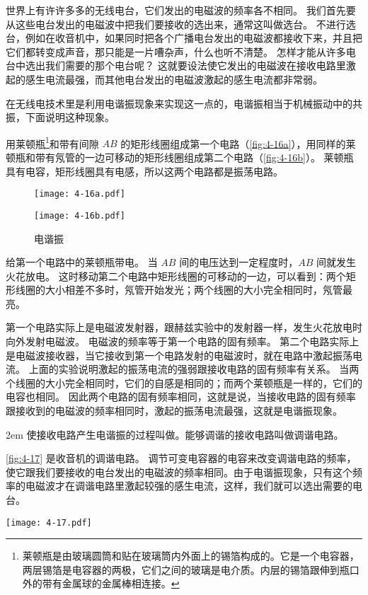 世界上有许许多多的无线电台，它们发出的电磁波的频率各不相同。
我们首先要从这些电台发出的电磁波中把我们要接收的选出来，通常这叫做选台。
不进行选台，例如在收音机中，如果同时把各个广播电台发出的电磁波都接收下来，并且把它们都转变成声音，那只能是一片嘈杂声，什么也听不清楚。
怎样才能从许多电台中选出我们需要的那个电台呢？
这就要设法使它发出的电磁波在接收电路里激起的感生电流最强，而其他电台发出的电磁波激起的感生电流都非常弱。

在无线电技术里是利用电谐振现象来实现这一点的，电谐振相当于机械振动中的共振，下面说明这种现象。

用莱顿瓶\footnote{莱顿瓶是由玻璃圆筒和贴在玻璃筒内外面上的锡箔构成的。它是一个电容器，两层锡箔是电容器的两极，它们之间的玻璃是电介质。内层的锡箔跟伸到瓶口外的带有金属球的金属棒相连接。}和带有间隙 $AB$ 的矩形线圈组成第一个电路（\cref{fig:4-16a}），用同样的莱顿瓶和带有氖管的一边可移动的矩形线圈组成第二个电路（\cref{fig:4-16b}）。
莱顿瓶具有电容，矩形线圈具有电感，所以这两个电路都是振荡电路。
\begin{figure}
	\begin{minipage}{0.48\linewidth}\centering
		\texttt{[image: 4-16a.pdf]}
	  \subcaption{}\label{fig:4-16a}
	\end{minipage}
	\begin{minipage}{0.48\linewidth}\centering
		\texttt{[image: 4-16b.pdf]}
	  \subcaption{}\label{fig:4-16b}
	\end{minipage}
	\caption{电谐振}\label{fig:4-16}
\end{figure}

给第一个电路中的莱顿瓶带电。
当 $AB$ 间的电压达到一定程度时，$AB$ 间就发生火花放电。
这时移动第二个电路中矩形线圈的可移动的一边，可以看到：两个矩形线圈的大小相差不多时，氖管开始发光；两个线圈的大小完全相同时，氖管最亮。

第一个电路实际上是电磁波发射器，跟赫兹实验中的发射器一样，发生火花放电时向外发射电磁波。
电磁波的频率等于第一个电路的固有频率。
第二个电路实际上是电磁波接收器，当它接收到第一个电路发射的电磁波时，就在电路中激起振荡电流。
上面的实验说明激起的振荡电流的强弱跟接收电路的固有频率有关系。
当两个线圈的大小完全相同时，它们的自感是相同的；而两个莱顿瓶是一样的，它们的电容也相同。
因此两个电路的固有频率相同，这就是说，当接收电路的固有频率跟接收到的电磁波的频率相同时，激起的振荡电流最强，这就是电谐振现象。

\medskip\noindent
\begin{minipage}{0.65\linewidth}\parindent2em
使接收电路产生电谐振的过程叫做。能够调谐的接收电路叫做调谐电路。

\cref{fig:4-17} 是收音机的调谐电路。
调节可变电容器的电容来改变调谐电路的频率，使它跟我们要接收的电台发出的电磁波的频率相同。由于电谐振现象，只有这个频率的电磁波才在调谐电路里激起较强的感生电流，这样，我们就可以选出需要的电台。
\end{minipage}\hfill
\begin{minipage}{0.3\linewidth}\centering
	\begin{figurehere}
		\texttt{[image: 4-17.pdf]}
		\caption{调谐电路}\label{fig:4-17}
	\end{figurehere}
\end{minipage}\par\medskip

